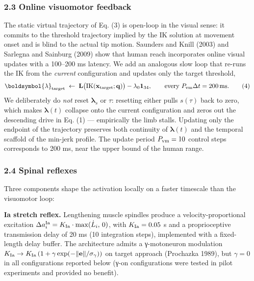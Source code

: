 \documentclass[
  11pt,
]{article}
\begin{document}
\hypertarget{online-visuomotor-feedback}{%
\subsubsection{2.3 Online visuomotor
feedback}\label{online-visuomotor-feedback}}

The static virtual trajectory of Eq. (3) is open-loop in the visual
sense: it commits to the threshold trajectory implied by the IK solution
at movement onset and is blind to the actual tip motion. Saunders and
Knill (2003) and Sarlegna and Sainburg (2009) show that human reach
incorporates online visual updates with a 100--200 ms latency. We add an
analogous slow loop that re-runs the IK from the \emph{current}
configuration and updates only the target threshold, \[
\boldsymbol{\lambda}_{\rm target} \;\leftarrow\; \mathbf{L}\bigl(\mathrm{IK}(\mathbf{x}_{\rm target};\mathbf{q})\bigr) - \lambda_{0}\mathbf{1}_{34},
\qquad \text{every } P_{\rm vm}\Delta t = 200\,\text{ms}. \tag{4}
\] We deliberately do \emph{not} reset \(\boldsymbol{\lambda}_{s}\) or
\(\tau\): resetting either pulls \(s(\tau)\) back to zero, which makes
\(\boldsymbol{\lambda}(t)\) collapse onto the current configuration and
zeros out the descending drive in Eq. (1) --- empirically the limb
stalls. Updating only the endpoint of the trajectory preserves both
continuity of \(\boldsymbol{\lambda}(t)\) and the temporal scaffold of
the min-jerk profile. The update period \(P_{\rm vm} = 10\) control
steps corresponds to 200 ms, near the upper bound of the human range.

\hypertarget{spinal-reflexes}{%
\subsubsection{2.4 Spinal reflexes}\label{spinal-reflexes}}

Three components shape the activation locally on a faster timescale than
the visuomotor loop:

\textbf{Ia stretch reflex.} Lengthening muscle spindles produce a
velocity-proportional excitation
\(\Delta a^{\rm Ia}_{i} = K_{\rm Ia}\cdot\max(\dot L_{i},\,0)\), with
\(K_{\rm Ia} = 0.05\) s and a proprioceptive transmission delay of 20 ms
(10 integration steps), implemented with a fixed-length delay buffer.
The architecture admits a γ-motoneuron modulation
\(K_{\rm Ia}\to K_{\rm Ia}\,(1+\gamma\exp(-\|\mathbf{e}\|/\sigma_{\gamma}))\)
on target approach (Prochazka 1989), but \(\gamma = 0\) in all
configurations reported below (γ-on configurations were tested in pilot
experiments and provided no benefit).
\end{document}

